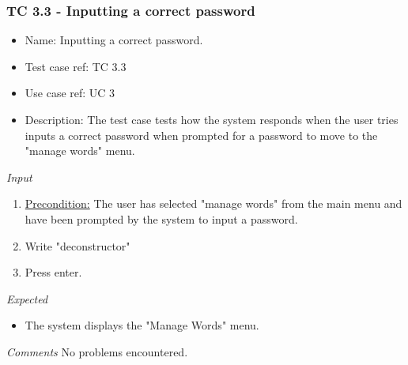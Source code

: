 \documentclass[12pt, letterpaper]{article}
\begin{document}
\subsubsection{TC 3.3 - Inputting a correct password}
\begin{itemize}
	\item Name: Inputting a correct password.
	\item Test case ref: TC 3.3
	\item Use case ref: UC 3
	\item Description: The test case tests how the system responds when the user tries inputs a correct password when prompted for a password to move to the "manage words" menu.
\end{itemize}
\emph{Input}
\begin{enumerate}
	\item \underline{Precondition:} The user has selected "manage words" from the main menu and have been prompted by the system to input a password.
	\item Write "deconstructor"
	\item Press enter.
\end{enumerate}
\emph{Expected}
\begin{itemize}
	\item The system displays the "Manage Words" menu.
\end{itemize}

\emph{Comments}
No problems encountered.
 
\end{document}
